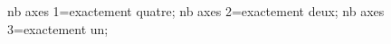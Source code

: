 \documentclass[exercice]{thedocument}%
\begin{document}
%
    \>nb axes 1=exactement quatre;%
    \>nb axes 2=exactement deux;%
    \>nb axes 3=exactement un;%
\end{document}
